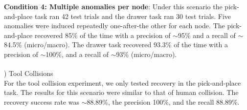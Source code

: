 \documentclass[letterpaper, 10 pt, conference]{ieeeconf}  %
\begin{document}
\textbf{Condition 4: Multiple anomalies per node}: Under this scenario the pick-and-place task ran 42 test trials and the drawer task ran 30 test trials. Five anomalies were induced repeatedly one-after-the other for each node. The pick-and-place recovered 85\% of the time with a precision of $\sim$95\% and a recall of $\sim$84.5\% (micro/macro). The drawer task recovered $93.3\%$ of the time with a precision of $\sim$100\%, and a recall of $\sim$93\% (micro/macro).\\\\
\theExperiment) Tool Collisions\\
For the tool collision experiment, we only tested recovery in the pick-and-place task. The results for this scenario were similar to that of human collision. The recovery success rate was $\sim$88.89\%, the precision 100\%, and the recall 88.89\%. 
\end{document}
